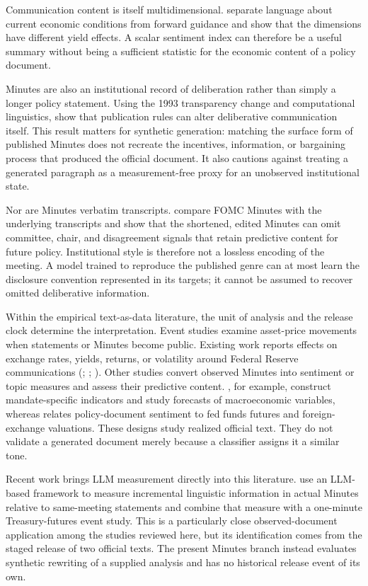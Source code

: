 Communication content is itself multidimensional. \citet{hansen2016shocking}
separate language about current economic conditions from forward guidance and
show that the dimensions have different yield effects. A scalar sentiment
index can therefore be a useful summary without being a sufficient statistic
for the economic content of a policy document.

Minutes are also an institutional record of deliberation rather than simply a
longer policy statement. Using the 1993 transparency change and computational
linguistics, \citet{hansen2018transparency} show that publication rules can
alter deliberative communication itself. This result matters for synthetic
generation: matching the surface form of published Minutes does not recreate
the incentives, information, or bargaining process that produced the official
document. It also cautions against treating a generated paragraph as a
measurement-free proxy for an unobserved institutional state.

Nor are Minutes verbatim transcripts. \citet{apel2022disclosure} compare FOMC
Minutes with the underlying transcripts and show that the shortened, edited
Minutes can omit committee, chair, and disagreement signals that retain
predictive content for future policy. Institutional style is therefore not a
lossless encoding of the meeting. A model trained to reproduce the published
genre can at most learn the disclosure convention represented in its targets;
it cannot be assumed to recover omitted deliberative information.

Within the empirical text-as-data literature, the unit of analysis and the
release clock determine the interpretation. Event studies examine asset-price
movements when statements or Minutes become public. Existing work reports
effects on exchange rates, yields, returns, or volatility around Federal
Reserve communications (\cite{rosa2011high}; \cite{rosa2013financial};
\cite{jubinski2013fomc}). Other studies convert observed Minutes into
sentiment or topic measures and assess their predictive content.
\citet{huang2021economic}, for example, construct mandate-specific indicators
and study forecasts of macroeconomic variables, whereas
\citet{tadle2022fomc} relates policy-document sentiment to fed funds futures
and foreign-exchange valuations. These designs study realized official text.
They do not validate a generated document merely because a classifier assigns
it a similar tone.

Recent work brings LLM measurement directly into this literature.
\citet{chen2026decoding} use an LLM-based framework to measure incremental
linguistic information in actual Minutes relative to same-meeting statements
and combine that measure with a one-minute Treasury-futures event study. This
is a particularly close observed-document application among the studies
reviewed here, but its identification comes from the staged release of two
official texts. The
present Minutes branch instead evaluates synthetic rewriting of a supplied
analysis and has no historical release event of its own.

